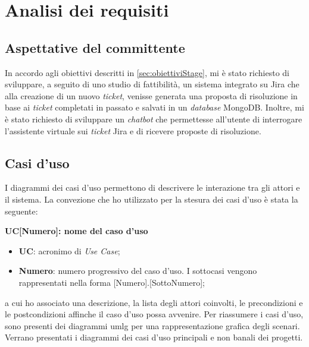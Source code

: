 \section{Analisi dei requisiti}
\subsection{Aspettative del committente}
In accordo agli obiettivi descritti in \ref{sec:obiettiviStage}, mi è stato richiesto di sviluppare, a seguito di uno studio di fattibilità, un sistema integrato su Jira che alla creazione di un nuovo \textit{ticket}, venisse generata una proposta di risoluzione in base ai \textit{ticket} completati in passato e salvati in un \textit{database} MongoDB.
Inoltre, mi è stato richiesto di sviluppare un \textit{chatbot} che permettesse all'utente di interrogare l'assistente virtuale sui \textit{ticket} Jira e di ricevere proposte di risoluzione.

\subsection{Casi d'uso}
I diagrammi dei casi d'uso permettono di descrivere le interazione tra gli attori e il sistema.  
La convezione che ho utilizzato per la stesura dei casi d'uso è stata la seguente:
\begin{center}
    \textbf{{UC[Numero]}: nome del caso d'uso}
\end{center}
\begin{itemize}
    \item \textbf{UC}: acronimo di \textit{Use Case};
    \item \textbf{Numero}: numero progressivo del caso d'uso. I sottocasi vengono rappresentati nella forma [Numero].[SottoNumero];
\end{itemize}
a cui ho associato una descrizione, la lista degli attori coinvolti, le precondizioni e le postcondizioni affinche il caso d'uso possa avvenire.
Per riassumere i casi d'uso, sono presenti dei diagrammi \gls{umlg} per una rappresentazione grafica degli scenari. Verrano presentati i diagrammi dei casi d'uso principali e non banali dei progetti.

